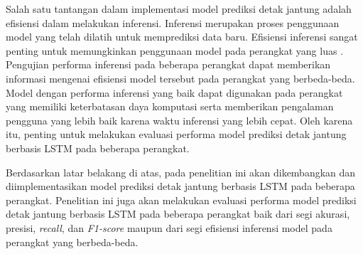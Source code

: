 Salah satu tantangan dalam implementasi model prediksi detak jantung adalah efisiensi dalam melakukan inferensi.
Inferensi merupakan proses penggunaan model yang telah dilatih untuk memprediksi data baru. 
Efisiensi inferensi sangat penting untuk memungkinkan penggunaan model pada perangkat yang luas \parencite{ulkerReviewingInferencePerformance2020}. 
Pengujian performa inferensi pada beberapa perangkat dapat memberikan informasi mengenai efisiensi model tersebut pada perangkat yang berbeda-beda.
Model dengan performa inferensi yang baik dapat digunakan pada perangkat yang memiliki keterbatasan daya komputasi serta memberikan pengalaman pengguna yang lebih baik karena waktu inferensi yang lebih cepat.
Oleh karena itu, penting untuk melakukan evaluasi performa model prediksi detak jantung berbasis LSTM pada beberapa perangkat.

Berdasarkan latar belakang di atas, pada penelitian ini akan dikembangkan dan diimplementasikan model prediksi detak jantung berbasis LSTM pada beberapa perangkat.
Penelitian ini juga akan melakukan evaluasi performa model prediksi detak jantung berbasis LSTM pada beberapa perangkat baik dari segi akurasi, presisi, \emph{recall}, dan \emph{F1-score} maupun dari segi efisiensi inferensi model pada perangkat yang berbeda-beda.





